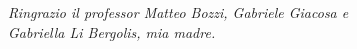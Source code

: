 \begin{flushright}
\vfill
\emph{
   Ringrazio il professor Matteo Bozzi, Gabriele Giacosa e \\
   Gabriella Li Bergolis, mia madre.
}
\end{flushright}
